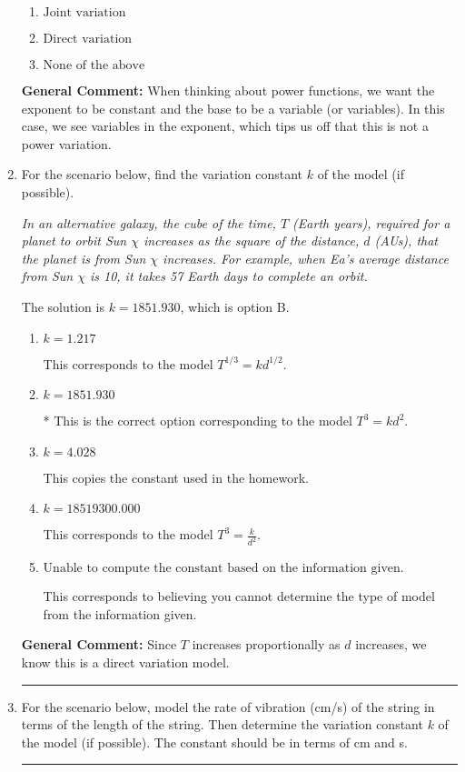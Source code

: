 \documentclass{extbook}[14pt]
\newcommand{\litem}[1]{\item #1

\rule{\textwidth}{0.4pt}}
\begin{document}
\begin{enumerate}
{\begin{enumerate}[label=\Alph*.]
\item \( \text{Joint variation} \)


\item \( \text{Direct variation} \)


\item \( \text{None of the above} \)


\end{enumerate}

\textbf{General Comment:} When thinking about power functions, we want the exponent to be constant and the base to be a variable (or variables). In this case, we see variables in the exponent, which tips us off that this is not a power variation.
}
\litem{
For the scenario below, find the variation constant $k$ of the model (if possible).

\begin{center}
    \textit{ In an alternative galaxy, the cube of the time, $T$ (Earth years), required for a planet to orbit Sun $\chi$ increases as the square of the distance, $d$ (AUs), that the planet is from Sun $\chi$ increases. For example, when Ea's average distance from Sun $\chi$ is 10, it takes 57 Earth days to complete an orbit. }
\end{center}
The solution is \( k = 1851.930 \), which is option B.\begin{enumerate}[label=\Alph*.]
\item \( k = 1.217 \)

This corresponds to the model $T^{1/3} = k d^{1/2}$.
\item \( k = 1851.930 \)

* This is the correct option corresponding to the model $T^{3} = k d^{2}$.
\item \( k = 4.028 \)

This copies the constant used in the homework.
\item \( k = 18519300.000 \)

This corresponds to the model $T^{3} = \frac{k}{d^{2}}$.
\item \( \text{Unable to compute the constant based on the information given.} \)

This corresponds to believing you cannot determine the type of model from the information given.
\end{enumerate}

\textbf{General Comment:} Since $T$ increases proportionally as $d$ increases, we know this is a direct variation model.
}
\litem{
For the scenario below, model the rate of vibration (cm/s) of the string in terms of the length of the string. Then determine the variation constant $k$ of the model (if possible). The constant should be in terms of cm and s.

}
\end{enumerate}
\end{document}
